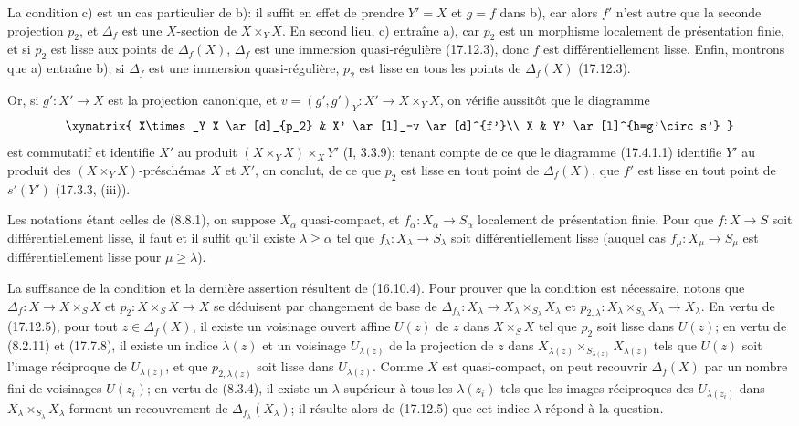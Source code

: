 
La condition c) est un cas particulier de b): il suffit en effet de prendre $Y'=X$ et $g=f$ dans b), car alors $f'$ n'est autre que la seconde projection $p_2$, et $\Delta_f$ est une $X$-section de $X\times_YX$. En second lieu, c) entraîne a), car $p_2$ est un morphisme localement de présentation finie, et si $p_2$ est lisse aux points de $\Delta_f(X)$, $\Delta_f$ est une immersion quasi-régulière (17.12.3), donc $f$ est différentiellement lisse. Enfin, montrons que a) entraîne b); si $\Delta_f$ est une immersion quasi-régulière, $p_2$ est lisse en tous les points de $\Delta_f(X)$ (17.12.3).

Or, si $g':X'\to X$ est la projection canonique, et $v=(g',g')_Y:X'\to X\times_YX$, on vérifie aussitôt que le diagramme
\[
\xymatrix{
  X\times_Y X \ar[d]_{p_2} & X' \ar[l]_-v \ar[d]^{f'}\\
  X & Y' \ar[l]^{h=g'\circ s'}
}
\]
est commutatif et identifie $X'$ au produit $(X\times_YX)\times_XY'$ (I, 3.3.9); tenant compte de ce que le diagramme (17.4.1.1) identifie $Y'$ au produit des $(X\times_YX)$-préschémas $X$ et $X'$, on conclut, de ce que $p_2$ est lisse en tout point de $\Delta_f(X)$, que $f'$ est lisse en tout point de $s'(Y')$ (17.3.3, (iii)).

\begin{corollary}[17.12.6]
\label{IV.17.12.6}
Les notations étant celles de (8.8.1), on suppose $X_\alpha$ quasi-compact, et $f_\alpha:X_\alpha\to S_\alpha$ localement de présentation finie. Pour que $f:X\to S$ soit différentiellement lisse, il faut et il suffit qu'il existe $\lambda\geq\alpha$ tel que $f_\lambda:X_\lambda\to S_\lambda$ soit différentiellement lisse (auquel cas $f_\mu:X_\mu\to S_\mu$ est différentiellement lisse pour $\mu\geq\lambda$).
\end{corollary}

La suffisance de la condition et la dernière assertion résultent de (16.10.4). Pour prouver que la condition est nécessaire, notons que $\Delta_f:X\to X\times_SX$ et $p_2:X\times_SX\to X$ se déduisent par changement de base de $\Delta_{f_\lambda}:X_\lambda\to X_\lambda\times_{S_\lambda}X_\lambda$ et $p_{2,\lambda}:X_\lambda\times_{S_\lambda}X_\lambda\to X_\lambda$. En vertu de (17.12.5), pour tout $z\in\Delta_f(X)$, il existe un voisinage ouvert affine $U(z)$ de $z$ dans $X\times_SX$ tel que $p_2$ soit lisse dans $U(z)$; en vertu de (8.2.11) et (17.7.8), il existe un indice $\lambda(z)$ et un voisinage $U_{\lambda(z)}$ de la projection de $z$ dans $X_{\lambda(z)}\times_{S_{\lambda(z)}}X_{\lambda(z)}$ tels que $U(z)$ soit l'image réciproque de $U_{\lambda(z)}$, et que $p_{2,\lambda(z)}$ soit lisse dans $U_{\lambda(z)}$. Comme $X$ est quasi-compact, on peut recouvrir $\Delta_f(X)$ par un nombre fini de voisinages $U(z_i)$; en vertu de (8.3.4), il existe un $\lambda$ supérieur à tous les $\lambda(z_i)$ tels que les images réciproques des $U_{\lambda(z_i)}$ dans $X_\lambda\times_{S_\lambda}X_\lambda$ forment un recouvrement de $\Delta_{f_\lambda}(X_\lambda)$; il résulte alors de (17.12.5) que cet indice $\lambda$ répond à la question.

